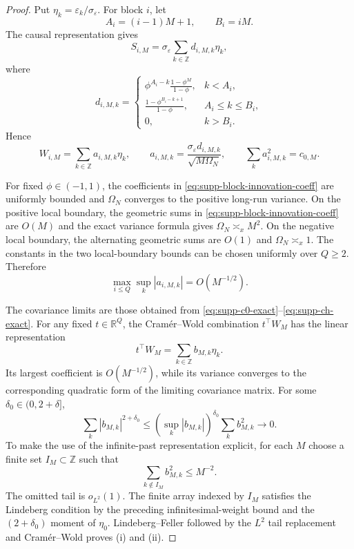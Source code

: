 \documentclass[12pt]{article}
\theoremstyle{remark}
\begin{document}
\begin{proof}
Put $\eta_k=\varepsilon_k/\sigma_\varepsilon$. For block $i$, let
\[
A_i=(i-1)M+1,
\qquad
B_i=iM.
\]
The causal representation gives
\[
S_{i,M}=\sigma_\varepsilon\sum_{k\in\mathbb Z}d_{i,M,k}\eta_k,
\]
where
\begin{equation}
d_{i,M,k}
=
\begin{cases}
\displaystyle
\phi^{A_i-k}\frac{1-\phi^M}{1-\phi},
& k<A_i,\\[2ex]
\displaystyle
\frac{1-\phi^{B_i-k+1}}{1-\phi},
& A_i\le k\le B_i,\\[2ex]
0,
& k>B_i.
\end{cases}
\label{eq:supp-block-innovation-coeff}
\end{equation}
Hence
\[
W_{i,M}
=
\sum_{k\in\mathbb Z}a_{i,M,k}\eta_k,
\qquad
a_{i,M,k}
=
\frac{\sigma_\varepsilon d_{i,M,k}}{\sqrt{M\Omega_N}},
\qquad
\sum_k a_{i,M,k}^2=c_{0,M}.
\]

For fixed $\phi\in(-1,1)$, the coefficients in
\eqref{eq:supp-block-innovation-coeff} are uniformly bounded and
$\Omega_N$ converges to the positive long-run variance. On the positive
local boundary, the geometric sums in
\eqref{eq:supp-block-innovation-coeff} are $O(M)$ and the exact variance
formula gives $\Omega_N\asymp_x M^2$. On the negative local boundary,
the alternating geometric sums are $O(1)$ and
$\Omega_N\asymp_x1$. The constants in the two local-boundary bounds can
be chosen uniformly over $Q\ge2$. Therefore
\begin{equation}
\max_{i\le Q}\sup_k|a_{i,M,k}|=O(M^{-1/2}).
\label{eq:supp-max-block-weight}
\end{equation}

The covariance limits are those obtained from
\eqref{eq:supp-c0-exact}--\eqref{eq:supp-ch-exact}. For any fixed
$t\in\mathbb R^Q$, the Cram\'er--Wold combination $t^\top W_M$ has the
linear representation
\[
t^\top W_M=\sum_{k\in\mathbb Z}b_{M,k}\eta_k.
\]
Its largest coefficient is $O(M^{-1/2})$, while its variance converges
to the corresponding quadratic form of the limiting covariance matrix.
For some $\delta_0\in(0,2+\delta]$,
\[
\sum_k|b_{M,k}|^{2+\delta_0}
\le
\left(\sup_k|b_{M,k}|\right)^{\delta_0}
\sum_kb_{M,k}^2
\longrightarrow0.
\]
To make the use of the infinite-past representation explicit, for each
$M$ choose a finite set $I_M\subset\mathbb Z$ such that
\[
\sum_{k\notin I_M}b_{M,k}^2\le M^{-2}.
\]
The omitted tail is $o_{L^2}(1)$. The finite array indexed by $I_M$
satisfies the Lindeberg condition by the preceding infinitesimal-weight
bound and the $(2+\delta_0)$ moment of $\eta_0$. Lindeberg--Feller
followed by the $L^2$ tail replacement and Cram\'er--Wold proves
(i) and (ii).


\end{proof}
\end{document}
